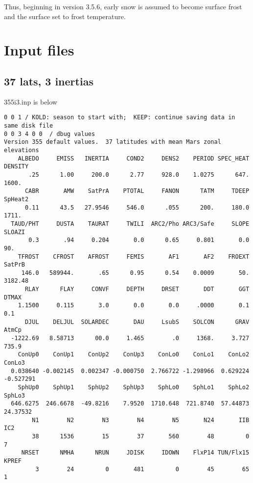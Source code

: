\documentclass{article}
\begin{document}
Thus, beginning in version 3.5.6, early snow is assumed to become surface frost
and the surface set to frost temperature.

\appendix %

\section{Input files} %
\subsection{37 lats, 3 inertias \label{apI}} %
355i3.inp is below
\vspace{-3.mm} 
\begin{verbatim}
0 0 1 / KOLD: season to start with;  KEEP: continue saving data in same disk file
0 0 3 4 0 0  / dbug values
Version 355 default values.  37 latitudes with mean Mars zonal elevations       
    ALBEDO     EMISS   INERTIA     COND2     DENS2    PERIOD SPEC_HEAT   DENSITY
       .25      1.00     200.0      2.77     928.0    1.0275      647.     1600.
      CABR       AMW    SatPrA    PTOTAL     FANON      TATM     TDEEP   SpHeat2
      0.11      43.5   27.9546     546.0      .055      200.     180.0     1711.
  TAUD/PHT     DUSTA    TAURAT     TWILI  ARC2/Pho ARC3/Safe     SLOPE    SLOAZI
       0.3       .94     0.204       0.0      0.65     0.801       0.0       90.
    TFROST    CFROST    AFROST     FEMIS       AF1       AF2    FROEXT    SatPrB
     146.0   589944.       .65      0.95      0.54    0.0009       50.   3182.48
      RLAY      FLAY     CONVF     DEPTH     DRSET       DDT       GGT     DTMAX
    1.1500     0.115       3.0       0.0       0.0     .0000       0.1       0.1
      DJUL    DELJUL  SOLARDEC       DAU     LsubS    SOLCON      GRAV     AtmCp
  -1222.69   8.58713      00.0     1.465        .0     1368.     3.727     735.9
    ConUp0    ConUp1    ConUp2    ConUp3    ConLo0    ConLo1    ConLo2    ConLo3
  0.038640 -0.002145  0.002347 -0.000750  2.766722 -1.298966  0.629224 -0.527291
    SphUp0    SphUp1    SphUp2    SphUp3    SphLo0    SphLo1    SphLo2    SphLo3
  646.6275  246.6678  -49.8216    7.9520  1710.648  721.8740  57.44873  24.37532
        N1        N2        N3        N4        N5       N24       IIB       IC2
        38      1536        15        37       560        48         0         7
     NRSET      NMHA      NRUN     JDISK     IDOWN    FlxP14 TUN/Flx15     KPREF
         3        24         0       481         0        45        65         1

\end{verbatim}
\end{document}
